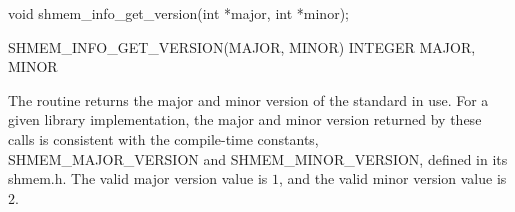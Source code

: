 \synC   %

void shmem_info_get_version(int *major, int *minor); %

\synF   %

SHMEM_INFO_GET_VERSION(MAJOR, MINOR)   
INTEGER MAJOR, MINOR %

{
\color{red}
  The routine returns the major and minor version of the \openshmem{} standard in use.
  For a given library implementation, the major and minor version returned by these calls is consistent with the compile-time constants, SHMEM\_MAJOR\_VERSION and SHMEM\_MINOR\_VERSION, defined in its shmem.h.
  The valid major version value is  $1$, and the valid minor version value is $2$. 
  \color{black}
}
{
}
\eAPI

